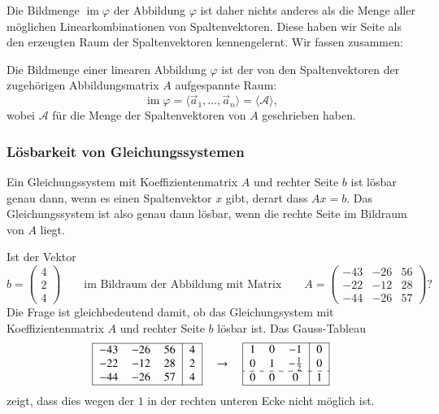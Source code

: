 Die Bildmenge $\operatorname{im}\varphi$ der Abbildung $\varphi$ ist
daher nichts anderes als die Menge aller möglichen Linearkombinationen
von Spaltenvektoren.
Diese haben wir Seite \pageref{skript:affin:koordinaten:aufgespannt}
als den erzeugten Raum der Spaltenvektoren kennengelernt.
Wir fassen zusammen:
\begin{satz}
Die Bildmenge einer linearen Abbildung $\varphi$ ist der von den
Spaltenvektoren der zugehörigen Abbildungsmatrix $A$ aufgespannte Raum:
\[
\operatorname{im}\varphi
=
\langle\vec{a}_1,\dots,\vec{a}_n\rangle
=
\langle\mathcal{A}\rangle,
\]
wobei $\mathcal{A}$ für die Menge der Spaltenvektoren von $A$ geschrieben
haben.
\end{satz}

\subsubsection{Lösbarkeit von Gleichungssystemen}
Ein Gleichungssystem mit Koeffizientenmatrix $A$ und rechter Seite $b$
ist lösbar genau dann, wenn es einen Spaltenvektor $x$ gibt, derart 
dass $Ax=b$.
Das Gleichungssystem ist also genau dann lösbar, wenn die rechte Seite
im Bildraum von $A$ liegt.

\begin{beispiel}
Ist der Vektor
\[
b=\begin{pmatrix}4\\2\\4\end{pmatrix}
\qquad\text{im Bildraum der Abbildung mit Matrix}\qquad
A=
\begin{pmatrix}
  -43& -26&  56\\
  -22& -12&  28\\
  -44& -26&  57
\end{pmatrix}\text{?}
\]
Die Frage ist gleichbedeutend damit, ob das Gleichungsystem mit
Koeffizientenmatrix $A$ und rechter Seite $b$ lösbar ist.
Das Gauss-Tableau
\[
\begin{tabular}{|>{$}c<{$}>{$}c<{$}>{$}c<{$}|>{$}c<{$}|}
\hline
  -43& -26&  56&4\\
  -22& -12&  28&2\\
  -44& -26&  57&4\\
\hline
\end{tabular}
\quad\rightarrow\quad
\begin{tabular}{|>{$}c<{$}>{$}c<{$}>{$}c<{$}|>{$}c<{$}|}
\hline
   1&  0& -1&  0\\
   0&  1& -\frac12&   0\\
\hdashline
   0&  0&  0&  1\\
\hline
\end{tabular}
\]
zeigt, dass dies wegen der $1$ in der rechten unteren Ecke nicht möglich
ist.
\end{beispiel}

